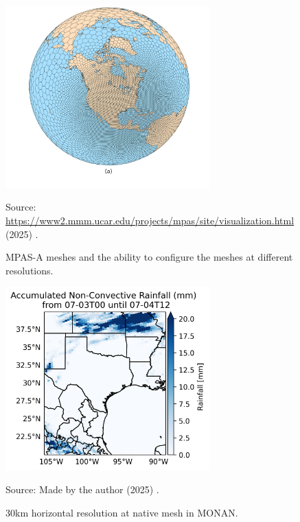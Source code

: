 \begin{figure}[htbp]
	\centering
	\caption{MPAS-A meshes and the ability to configure the meshes at different resolutions.} 
	\includegraphics[width=0.7\textwidth, trim=10 70 10 0, clip]{docs/figuras/chapter3/ncl_plots_a.png} %
	\vspace{2mm}
	
	\centering 
	Source: \url{https://www2.mmm.ucar.edu/projects/mpas/site/visualization.html} (2025) .\par
	\label{fig:mpas-a} %
\end{figure}

\begin{figure}[htbp]
	\centering
	\caption{30km horizontal resolution at native mesh in MONAN.} 
	\includegraphics[width=0.7\textwidth, trim=0 0 0 0, clip]{docs/figuras/chapter3/rain_plot_native_grid.png} %
	\vspace{2mm}
	
	\centering 
	Source: Made by the author (2025) .\par
	\label{fig:non-convective rainfall} %
\end{figure}

